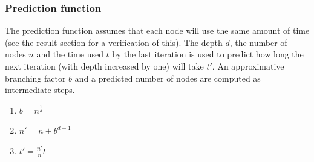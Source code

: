 \documentclass[a4paper,11pt]{article}
\begin{document}

%

\subsubsection{Prediction function}
The prediction function assumes that each node will use the same amount of time (see the result section for a verification of this). The depth $d$, the number of nodes $n$ and the time used $t$ by the last iteration is used to predict how long the next iteration (with depth increased by one) will take $t'$. An approximative branching factor $b$ and a predicted number of nodes are computed as intermediate steps.
\begin{enumerate}
\item $b = n^{\frac{1}{d}}$
\item $n' = n + b^{d+1}$
\item $t' = \frac{n'}{n}t$
\end{enumerate}
\end{document}
